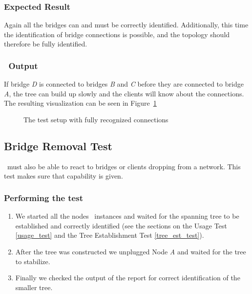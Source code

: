 \subsubsection*{Expected Result}
Again all the bridges can and must be correctly identified.
Additionally, this time the identification of bridge connections is possible, and the topology should therefore be fully identified.

\subsubsection*{\tool\ Output}
If bridge \textit{D} is connected to bridges \textit{B} and \textit{C} before they are connected to bridge \textit{A}, the tree can build up slowly and the clients will know about the connections.
The resulting visualization can be seen in Figure~\ref{fig:est}
\begin{figure}[h]
    \centering
    \caption{The test setup with fully recognized connections}
    \label{fig:est}
\end{figure}

\subsection*{Bridge Removal Test}
\label{removal_test}
\tool\ must also be able to react to bridges or clients dropping from a network.
This test makes sure that capability is given.

\subsubsection*{Performing the test}
\begin{enumerate}
    \item We started all the nodes \tool\ instances and waited for the spanning tree to be established and correctly identified (see the sections on the Usage Test \ref{usage_test} and the Tree Establishment Test \ref{tree_est_test}).
    \item After the tree was constructed we unplugged Node \textit{A} and waited for the tree to stabilize.
    \item Finally we checked the output of the report for correct identification of the smaller tree.
\end{enumerate}

